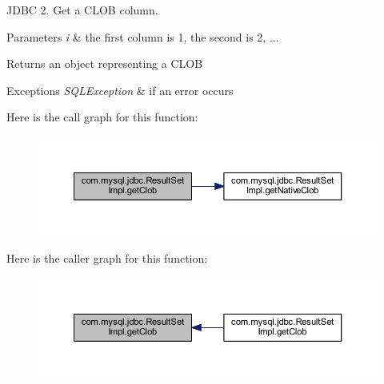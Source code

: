 J\+D\+BC 2. Get a C\+L\+OB column.


\begin{DoxyParams}{Parameters}
{\em i} & the first column is 1, the second is 2, ...\\
\hline
\end{DoxyParams}
\begin{DoxyReturn}{Returns}
an object representing a C\+L\+OB
\end{DoxyReturn}

\begin{DoxyExceptions}{Exceptions}
{\em S\+Q\+L\+Exception} & if an error occurs \\
\hline
\end{DoxyExceptions}
Here is the call graph for this function\+:
\nopagebreak
\begin{figure}[H]
\begin{center}
\leavevmode
\includegraphics[width=350pt]{classcom_1_1mysql_1_1jdbc_1_1_result_set_impl_a9a0298e829cc6e29bf17f112e310dc0b_cgraph}
\end{center}
\end{figure}
Here is the caller graph for this function\+:
\nopagebreak
\begin{figure}[H]
\begin{center}
\leavevmode
\includegraphics[width=350pt]{classcom_1_1mysql_1_1jdbc_1_1_result_set_impl_a9a0298e829cc6e29bf17f112e310dc0b_icgraph}
\end{center}
\end{figure}
\mbox{\label{classcom_1_1mysql_1_1jdbc_1_1_result_set_impl_a69deb5487ef64b397460ff4fdea4c13d}} 
